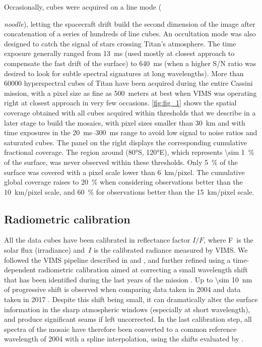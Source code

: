 \documentclass[preprint,twocolumn,5p,authoryear,compress,colorlinks=true]{elsarticle}
\newcommand{\figref}[1]{\autoref{fig:#1}}
\begin{document}
Occasionally, cubes were acquired on a line mode ({\emph{noodle}), letting the spacecraft drift build the second dimension of the image after concatenation of a series of hundreds of line cubes.
An occultation mode was also designed to catch the signal of stars crossing Titan's atmosphere.
The time exposure generally ranged from \SI{13}{ms} (used mostly at closest approach to compensate the fast drift of the surface) to \SI{640}{ms} (when a higher S/N ratio was desired to look for subtle spectral signatures at long wavelengths).
More than \num{60000} hyperspectral cubes of Titan have been acquired during the entire Cassini mission, with a pixel size as fine as \SI{500}{meters} at best when VIMS was operating right at closest approach in very few occasions. \figref{fig_1} shows the spatial coverage obtained with all cubes acquired within thresholds that we describe in a later stage to build the mosaics, with pixel sizes smaller than \SI{30}{km} and with time exposures in the \SIrange{20}{300}{ms} range to avoid low signal to noise ratios and saturated cubes. The panel on the right displays the corresponding cumulative fractional coverage. The region around (\ang{80}S, \ang{120}E), which represents \SI{\sim 1}{\percent} of the surface, was never observed within these thresholds. Only \SI{5}{\percent} of the surface was covered with a pixel scale lower than \SI{6}{km/pixel}. The cumulative global coverage raises to \SI{20}{\percent} when considering observations better than the \SI{10}{km/pixel} scale, and \SI{60}{\percent} for observations better than the \SI{15}{km/pixel} scale.

\subsection{Radiometric calibration}
All the data cubes have been calibrated in reflectance factor $I/F$, where F is the solar flux (irradiance) and $I$ is the calibrated radiance measured by VIMS. We followed the VIMS pipeline described in \cite{Brown2004} and \cite{Barnes2007}, and further refined using a time-dependent radiometric calibration aimed at correcting a small wavelength shift that has been identified during the last years of the mission \citep{Clark2018}. Up to \SI{\sim 10}{nm} of progressive shift is observed when comparing data taken in 2004 and data taken in 2017 \citep{Clark2018}. Despite this shift being small, it can dramatically alter the surface information in the sharp atmospheric windows (especially at short wavelength), and produce significant seams if left uncorrected. In the last calibration step, all spectra of the mosaic have therefore been converted to a common reference wavelength of 2004 with a spline interpolation, using the shifts evaluated by \citep{Clark2018}.

}
\end{document}
